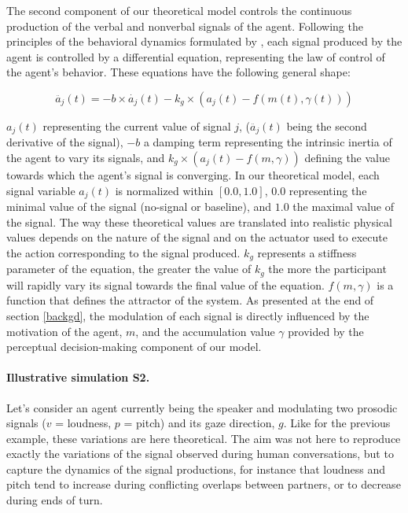 The second component of our theoretical model controls the continuous production of the verbal and nonverbal signals of the agent.
Following the principles of the behavioral dynamics formulated by \citep{warren_dynamics_2006}, each signal produced by the agent is controlled by a differential equation, representing the law of control of the agent's behavior. These equations have the following general shape: 

\begin{equation}
  \ddot{a_j}(t)= -b\times\dot{a_j}(t) - k_g \times(a_j(t) - f(m(t),\gamma(t)))
  \label{signal_control}
\end{equation}

$a_j(t)$ representing the current value of signal $j$, ($\ddot{a_j}(t)$ being the second derivative of the signal), $-b$ a damping term representing the intrinsic inertia of the agent to vary its signals, and $k_g\times(a_j(t)-f(m,\gamma))$ defining the value towards which the agent's signal is converging. In our theoretical model, each signal variable $a_j(t)$ is normalized within $ [0.0,1.0] $, $0.0$ representing the minimal value of the signal (no-signal or baseline), and $1.0$ the maximal value of the signal. The way these theoretical values are translated into realistic physical values depends on the nature of the signal and on the actuator used to execute the action corresponding to the signal produced. 
$k_g$ represents a stiffness parameter of the equation, the greater the value of $k_g$ the more the participant will rapidly vary its signal towards the final value of the equation. 
$f(m,\gamma)$ is a function that defines the attractor of the system. As presented at the end of section \ref{backgd}, the modulation of each signal is directly influenced by the motivation of the agent, $m$, and the accumulation value $\gamma$ provided by the perceptual decision-making component of our model.

\paragraph{Illustrative simulation S2.} Let's consider an agent currently being the speaker and modulating two prosodic signals ($v$ = loudness, $p$ = pitch) and its gaze direction, $g$. 
Like for the previous example, these variations are here theoretical.
The aim was not here to reproduce exactly the variations of the signal observed during human conversations, but to capture the dynamics of the signal productions, for instance that loudness and pitch tend to increase %
during conflicting overlaps between partners, or to decrease during ends of turn. 

